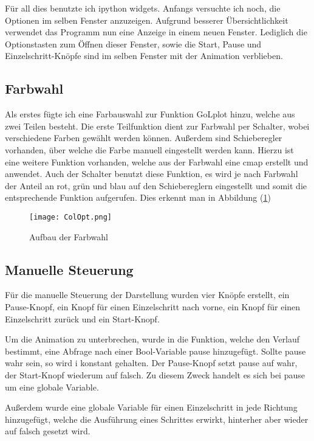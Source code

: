 \documentclass{scrartcl}
\begin{document}
Für all dies benutzte ich ipython widgets.
Anfangs versuchte ich noch, die Optionen im selben Fenster anzuzeigen. Aufgrund besserer Übersichtlichkeit verwendet das Programm nun eine Anzeige in einem neuen Fenster. Lediglich die Optionstasten zum Öffnen dieser Fenster, sowie die Start, Pause und Einzelschritt-Knöpfe sind im selben Fenster mit der Animation verblieben.

\subsection{Farbwahl}
Als erstes fügte ich eine Farbauswahl zur Funktion GoLplot hinzu, welche aus zwei Teilen besteht. Die erste Teilfunktion dient zur Farbwahl per Schalter, wobei verschiedene Farben gewählt werden können. Außerdem sind Schieberegler vorhanden, über welche die Farbe manuell eingestellt werden kann. Hierzu ist eine weitere Funktion vorhanden, welche aus der Farbwahl eine cmap erstellt und anwendet. Auch der Schalter benutzt diese Funktion, es wird je nach Farbwahl der Anteil an rot, grün und blau auf den Schiebereglern eingestellt und somit die entsprechende Funktion aufgerufen. Dies erkennt man in Abbildung (\ref{col})

\begin{figure}[!h]
	\begin{center}
		\texttt{[image: ColOpt.png]}
		\caption{Aufbau der Farbwahl}
		\label{col}
	\end{center}
\end{figure}

\subsection{Manuelle Steuerung}
Für die manuelle Steuerung der Darstellung wurden vier Knöpfe erstellt, ein Pause-Knopf, ein Knopf für einen Einzelschritt nach vorne, ein Knopf für einen Einzelschritt zurück und ein Start-Knopf.

Um die Animation zu unterbrechen, wurde in die Funktion, welche den Verlauf bestimmt, eine Abfrage nach einer Bool-Variable pause hinzugefügt. Sollte pause wahr sein, so wird i konstant gehalten. Der Pause-Knopf setzt pause auf wahr, der Start-Knopf wiederum auf falsch. Zu diesem Zweck handelt es sich bei pause um eine globale Variable.

Außerdem wurde eine globale Variable für einen Einzelschritt in jede Richtung hinzugefügt, welche die Ausführung eines Schrittes erwirkt, hinterher aber wieder auf falsch gesetzt wird.
\end{document}
